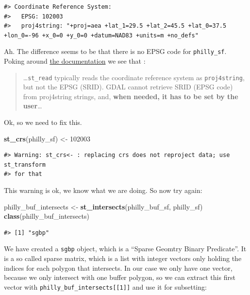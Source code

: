 \documentclass[]{book}
\newenvironment{Shaded}{\begin{snugshade}}{\end{snugshade}}
\newcommand{\KeywordTok}[1]{\textcolor[rgb]{0.13,0.29,0.53}{\textbf{#1}}}
\newcommand{\DecValTok}[1]{\textcolor[rgb]{0.00,0.00,0.81}{#1}}
\newcommand{\StringTok}[1]{\textcolor[rgb]{0.31,0.60,0.02}{#1}}
\newcommand{\NormalTok}[1]{#1}
\begin{document}
\begin{verbatim}
#> Coordinate Reference System:
#>   EPSG: 102003 
#>   proj4string: "+proj=aea +lat_1=29.5 +lat_2=45.5 +lat_0=37.5 +lon_0=-96 +x_0=0 +y_0=0 +datum=NAD83 +units=m +no_defs"
\end{verbatim}

Ah. The difference seems to be that there is no EPSG code for
\texttt{philly\_sf}. Poking around
\href{https://r-spatial.github.io/sf/articles/sf1.html}{the
documentation} we see that :

\begin{quote}
\ldots{}\texttt{st\_read} typically reads the coordinate reference
system as \texttt{proj4string}, but not the EPSG (SRID). GDAL cannot
retrieve SRID (EPSG code) from proj4string strings, and, \textbf{when
needed, it has to be set by the user}\ldots{}
\end{quote}

Ok, so we need to fix this.

\begin{Shaded}
\begin{Highlighting}[]
\KeywordTok{st_crs}\NormalTok{(philly_sf) <-}\StringTok{ }\DecValTok{102003}
\end{Highlighting}
\end{Shaded}

\begin{verbatim}
#> Warning: st_crs<- : replacing crs does not reproject data; use st_transform
#> for that
\end{verbatim}

This warning is ok, we know what we are doing. So now try again:

\begin{Shaded}
\begin{Highlighting}[]
\NormalTok{philly_buf_intersects <-}\StringTok{ }\KeywordTok{st_intersects}\NormalTok{(philly_buf_sf, philly_sf)}
\KeywordTok{class}\NormalTok{(philly_buf_intersects)}
\end{Highlighting}
\end{Shaded}

\begin{verbatim}
#> [1] "sgbp"
\end{verbatim}

We have created a \texttt{sgbp} object, which is a ``Sparse Geomtry
Binary Predicate''. It is a so called sparse matrix, which is a list
with integer vectors only holding the indices for each polygon that
intersects. In our case we only have one vector, because we only
intersect with one buffer polygon, so we can extract this first vector
with \texttt{philly\_buf\_intersects{[}{[}1{]}{]}} and use it for
subsetting:
\end{document}
